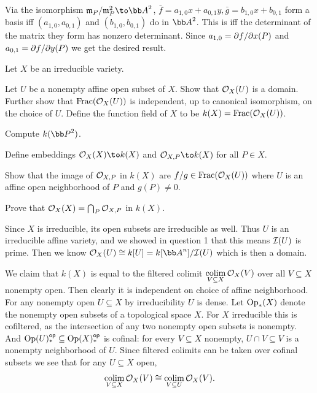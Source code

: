     \item Via the isomorphism $\m_P/\m_P^2\to\bA^2$, $\bar f=a_{1,0}x+a_{0,1}y,\bar g=b_{1,0}x+b_{0,1}$ form a basis iff $(a_{1,0},a_{0,1})$ and $(b_{1,0},b_{0,1})$ do in $\bA^2$.
    This is iff the determinant of the matrix they form has nonzero determinant.
    Since $a_{1,0}={\partial f}/{\partial x}(P)$ and $a_{0,1}={\partial f}/{\partial y}(P)$ we get the desired result.
\eenum

\bprob

    Let $X$ be an irreducible variety.
    \benum
        \item Let $U$ be a nonempty affine open subset of $X$.
        Show that ${{\cal O}}_X(U)$ is a domain.
        Further show that ${\rm Frac}({{\cal O}}_X(U))$ is independent, up to canonical isomorphism, on the choice of $U$.
        Define the {\emphcolor function field} of $X$ to be $k(X)={\rm Frac}({{\cal O}}_X(U))$.

        \item Compute $k(\bP^2)$.

        \item Define embeddings $\O_X(X)\to k(X)$ and $\O_{X,P}\to k(X)$ for all $P\in X$.

        \item Show that the image of ${{\cal O}}_{X,P}$ in $k(X)$ are $f/g\in{\rm Frac}({{\cal O}}_X(U))$ where $U$ is an affine open neighborhood of $P$
        and $g(P)\neq0$.

        \item Prove that ${{\cal O}}_X(X)=\bigcap_P{{\cal O}}_{X,P}$ in $k(X)$.
    \eenum

\eprob

\benum
    \item Since $X$ is irreducible, its open subsets are irreducible as well.
    Thus $U$ is an irreducible affine variety, and we showed in question 1 that this means ${{\cal I}}(U)$ is prime.
    Then we know $\O_X(U)\cong k[U]=k[\bA^n]/\I(U)$ which is then a domain.

    We claim that $k(X)$ is equal to the filtered colimit $\mathop{\rm colim}\limits_{V\subseteq X}{{\cal O}}_X(V)$ over all $V\subseteq X$ nonempty open.
    Then clearly it is independent on choice of affine neighborhood.
    For any nonempty open $U\subseteq X$ by irreducibility $U$ is dense.
    Let ${\rm Op}_*(X)$ denote the nonempty open subsets of a topological space $X$.
    For $X$ irreducible this is cofiltered, as the intersection of any two nonempty open subsets is nonempty.
    And ${\rm Op}(U)_*^{\sf op}\subseteq{\rm Op}(X)_*^{\sf op}$ is cofinal: for every $V\subseteq X$ nonempty, $U\cap V\subseteq V$ is a nonempty neighborhood
    of $U$.
    Since filtered colimits can be taken over cofinal subsets we see that for any $U\subseteq X$ open,
    $$ \mathop{\rm colim}\limits_{V\subseteq X}{{\cal O}}_X(V) \cong \mathop{\rm colim}\limits_{V\subseteq U}{{\cal O}}_X(V) . $$

